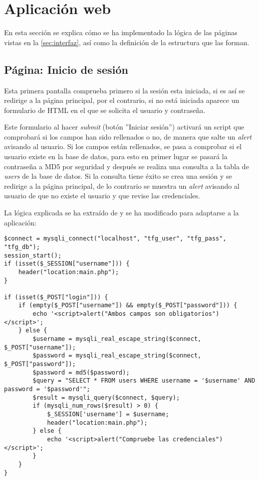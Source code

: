 \section{Aplicación web}\label{sec:implAplicacion}
En esta sección se explica cómo se ha implementado la lógica de las páginas vistas en la \autoref{sec:interfaz}, así como la definición de la estructura que las forman.

\subsection{Página: Inicio de sesión}
Esta primera pantalla comprueba primero si la sesión esta iniciada, si es así se redirige a la página principal, por el contrario, si no está iniciada aparece un formulario de HTML en el que se solicita el usuario y contraseña. 

Este formulario al hacer \textit{submit} (botón ''Iniciar sesión'') activará un script que comprobará si los campos han sido rellenados o no, de manera que salte un \textit{alert} avisando al usuario. Si los campos están rellenados, se pasa a comprobar si el usuario existe en la base de datos, para esto en primer lugar se pasará la contraseña a MD5 por seguridad y después se realiza una consulta a la tabla de \textit{users} de la base de datos. Si la consulta tiene éxito se crea una sesión y se redirige a la página principal, de lo contrario se muestra un \textit{alert} avisando al usuario de que no existe el usuario y que revise las credenciales.

La lógica explicada se ha extraído de \cite{webslesson_php_nodate} y se ha modificado para adaptarse a la aplicación:
\begin{lstlisting}
$connect = mysqli_connect("localhost", "tfg_user", "tfg_pass", "tfg_db");
session_start();
if (isset($_SESSION["username"])) {
    header("location:main.php");
}

if (isset($_POST["login"])) {
    if (empty($_POST["username"]) && empty($_POST["password"])) {
        echo '<script>alert("Ambos campos son obligatorios")</script>';
    } else {
        $username = mysqli_real_escape_string($connect, $_POST["username"]);
        $password = mysqli_real_escape_string($connect, $_POST["password"]);
        $password = md5($password);
        $query = "SELECT * FROM users WHERE username = '$username' AND password = '$password'";
        $result = mysqli_query($connect, $query);
        if (mysqli_num_rows($result) > 0) {
            $_SESSION['username'] = $username;
            header("location:main.php");
        } else {
            echo '<script>alert("Compruebe las credenciales")</script>';
        }
    }
}
\end{lstlisting}

